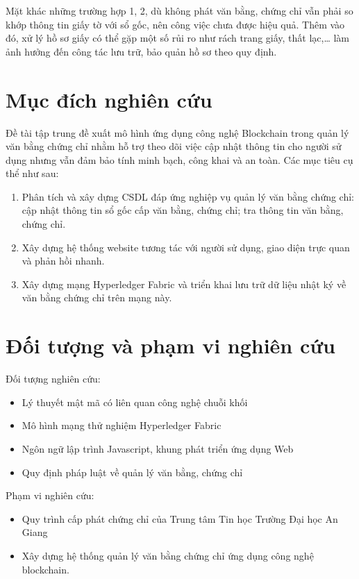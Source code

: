 Mặt khác những trường hợp 1, 2, dù không phát văn bằng, chứng chỉ vẫn phải so khớp thông tin giấy tờ với sổ gốc, nên công việc chưa được hiệu quả. Thêm vào đó, xử lý hồ sơ giấy có thể gặp một số rủi ro như rách trang giấy, thất lạc,\ldots{} làm ảnh hưởng đến công tác lưu trữ, bảo quản hồ sơ theo quy định.

\section{Mục đích nghiên cứu}

Đề tài tập trung đề xuất mô hình ứng dụng công nghệ Blockchain trong quản lý văn bằng chứng chỉ nhằm hỗ trợ theo dõi việc cập nhật thông tin cho người sử dụng nhưng vẫn đảm bảo tính minh bạch, công khai và an toàn. Các mục tiêu cụ thể như sau:

\begin{enumerate}
\item Phân tích và xây dựng CSDL đáp ứng nghiệp vụ quản lý văn bằng chứng chỉ: cập nhật thông tin sổ gốc cấp văn bằng, chứng chỉ; tra thông tin văn bằng, chứng chỉ.
\item Xây dựng hệ thống website tương tác với người sử dụng, giao diện trực quan và phản hồi nhanh.
\item Xây dựng mạng Hyperledger Fabric và triển khai lưu trữ dữ liệu nhật ký về văn bằng chứng chỉ trên mạng này.
\end{enumerate}

\section{Đối tượng và phạm vi nghiên cứu}

Đối tượng nghiên cứu:

\begin{itemize}
\item Lý thuyết mật mã có liên quan công nghệ chuỗi khối
\item Mô hình mạng thử nghiệm Hyperledger Fabric
\item Ngôn ngữ lập trình Javascript, khung phát triển ứng dụng Web
\item Quy định pháp luật về quản lý văn bằng, chứng chỉ
\end{itemize}

Phạm vi nghiên cứu:

\begin{itemize}
\item Quy trình cấp phát chứng chỉ của Trung tâm Tin học Trường Đại học An Giang
\item Xây dựng hệ thống quản lý văn bằng chứng chỉ ứng dụng công nghệ blockchain.
\end{itemize}

